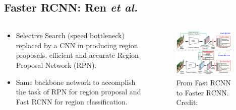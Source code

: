 \documentclass{beamer}
\begin{document}
\subsection{Faster RCNN: Ren \it{et al.} \cite{ren_faster_2015}}
\begin{frame}{}
	\begin{columns}
		\begin{column}{0.5\textwidth}
			\begin{itemize}
				\item Selective Search (speed bottleneck) replaced by a CNN in producing region proposals, efficient and accurate Region Proposal Network (RPN).
				\item Same backbone network to accomplish the task of RPN for region proposal and Fast RCNN for region classification.
			\end{itemize}
		\end{column}
		\begin{column}{0.5\textwidth}
			\begin{figure}
				\centering
				\includegraphics[width=0.9\textwidth]{images/fastrcnn-fasterrcnn.PNG}
				\caption{From Fast RCNN to Faster RCNN.
					\hbox{\scriptsize Credit:}}
			\end{figure}
		\end{column}
	\end{columns}
\end{frame}
\end{document}

